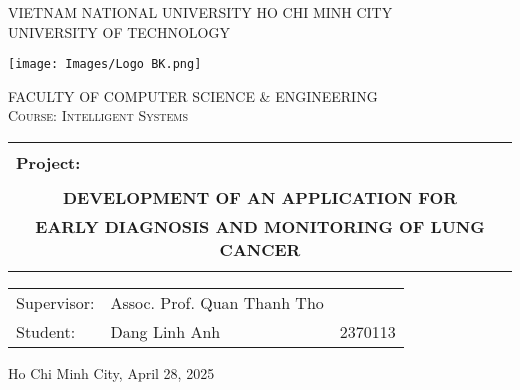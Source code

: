 \documentclass[12pt, a4paper]{article}
\begin{document}
\begin{titlepage}

        
	\centering
	
	{\scshape\large VIETNAM NATIONAL UNIVERSITY HO CHI MINH CITY\\UNIVERSITY OF TECHNOLOGY \par}
	\vspace{0.5cm}
	\texttt{[image: Images/Logo BK.png]}\par\vspace{0.1 cm}
	{\scshape\large FACULTY OF COMPUTER SCIENCE \& ENGINEERING \\
	                Course: Intelligent Systems\par}
	\vspace{1.5cm}

	\begin{center}
	    \color{blue}
	    \begin{tabular}{c}
	    \hline
	    \\
	    \multicolumn{1}{l}{\large \bfseries Project:}\\
	    \\
	    \Large \bfseries DEVELOPMENT OF AN APPLICATION FOR \\
        \Large \bfseries EARLY DIAGNOSIS AND MONITORING OF LUNG CANCER \\
	    \\
	    \hline
	    \end{tabular}
	\end{center}

	\vspace{1cm}
	\begin{center}
	    \large 
	    \begin{tabular}{l l l}
	        Supervisor:   &  Assoc. Prof. Quan Thanh Tho &\\
	        Student:   &  Dang Linh Anh & 2370113\\
	    \end{tabular}
	    
	\end{center}
    \vspace{1.5cm}
	\vfill
	{ Ho Chi Minh City, April 28, 2025 }
\end{titlepage}
\end{document}

